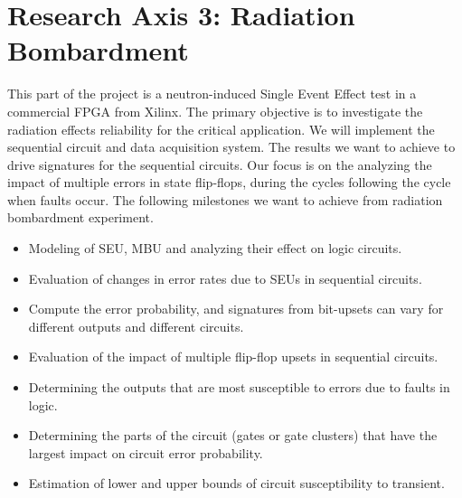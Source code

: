 \section{Research Axis 3: Radiation Bombardment}
This part of the project is a neutron-induced Single Event Effect test in a commercial FPGA from Xilinx. The primary objective is to investigate the radiation effects reliability for the critical application. We will implement the sequential circuit and data acquisition system. The results we want to achieve to drive signatures for the sequential circuits. Our focus is on the analyzing the impact of multiple errors in state flip-flops, during the cycles following the cycle when faults occur. The following milestones we want to achieve from radiation bombardment experiment.

\begin{itemize}
\item Modeling of SEU, MBU and analyzing their effect on logic circuits.
\item Evaluation of changes in error rates due to SEUs in sequential circuits.
\item Compute the error probability, and signatures from bit-upsets can vary for different outputs and different circuits. 
\item Evaluation of the impact of multiple flip-flop upsets in sequential circuits.
\item Determining the outputs that are most susceptible to errors due to faults in logic.
\item Determining the parts of the circuit (gates or gate clusters) that have the largest impact on circuit error probability.
\item Estimation of lower and upper bounds of circuit susceptibility to transient.
\end{itemize} 
%
%
%

